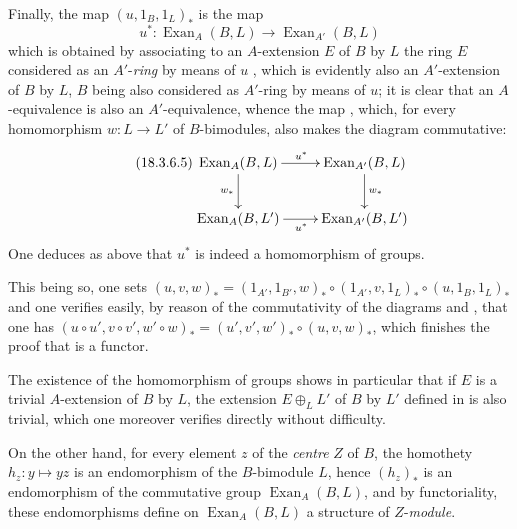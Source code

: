 \begin{env}[18.3.6.4]
\label{0.18.3.6.4}
Finally, the map $(u,1_B,1_L)_*$ is the map
\begin{equation}
  u^*:\operatorname{Exan}_A(B,L)\to\operatorname{Exan}_{A'}(B,L)
\end{equation}
which is obtained by associating to an $A$-extension $E$ of $B$ by $L$ the ring $E$ considered as an $A'$-\emph{ring} by means of $u$ , which is evidently also an $A'$-extension of $B$ by $L$, $B$ being also considered as $A'$-ring by means of $u$; it is clear that an $A$-equivalence is also an $A'$-equivalence, whence the map , which, for every homomorphism $w:L\to L'$ of $B$-bimodules, also makes the diagram commutative:
  \begin{equation}
  \tag{18.3.6.5}
  \label{0.18.3.6.5}
  \xymatrix{
    \operatorname{Exan}_A(B,L)\ar[r]^{u^*}\ar[d]_{w_*} & \operatorname{Exan}_{A'}(B,L)\ar[d]^{w_*}\\
    \operatorname{Exan}_A(B,L')\ar[r]_{u^*} & \operatorname{Exan}_{A'}(B,L')
  }
  \end{equation}
One deduces as above that $u^*$ is indeed a homomorphism of groups.

This being so, one sets $(u,v,w)_*=(1_{A'},1_{B'},w)_*\circ(1_{A'},v,1_L)_*\circ(u,1_B,1_L)_*$ and one verifies easily, by reason of the commutativity of the diagrams  and , that one has $(u\circ u',v\circ v',w'\circ w)_*=(u',v',w')_*\circ(u,v,w)_*$, which finishes the proof that  is a functor.

The existence of the homomorphism of groups  shows in particular that if $E$ is a trivial $A$-extension of $B$ by $L$, the extension $E\oplus_L L'$ of $B$ by $L'$ defined in  is also trivial, which one moreover verifies directly without difficulty.

On the other hand, for every element $z$ of the \emph{centre} $Z$ of $B$, the homothety $h_z:y\mapsto yz$ is an endomorphism of the $B$-bimodule $L$, hence $(h_z)_*$ is an endomorphism of the commutative group $\operatorname{Exan}_A(B,L)$, and by functoriality, these endomorphisms define on $\operatorname{Exan}_A(B,L)$ a structure of $Z$-\emph{module}.
\end{env}

